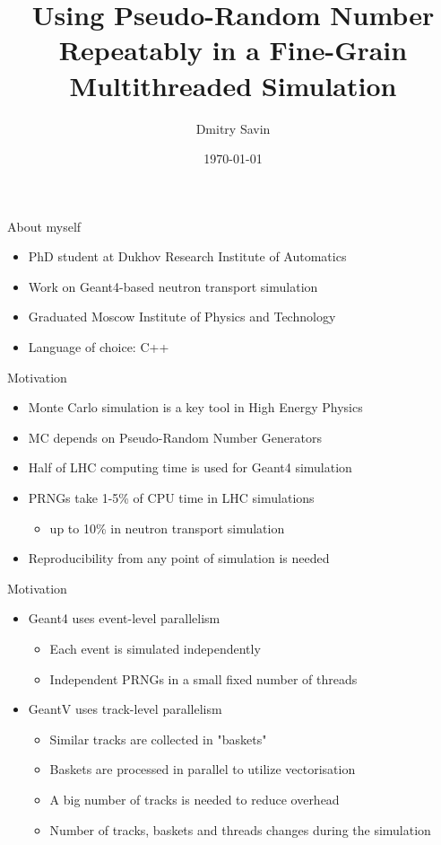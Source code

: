 \documentclass[aspectratio=169, 14pt]{beamer}
\title{Using Pseudo-Random Number Repeatably in a Fine-Grain Multithreaded Simulation}
\author{Dmitry Savin}
\date{\today}
\begin{document}
\begin{large}

 \frame{\titlepage}

 \begin{frame}{About myself}
  \begin{itemize}
   \item PhD student at Dukhov Research Institute of Automatics
   \item Work on Geant4-based neutron transport simulation
   \item Graduated Moscow Institute of Physics and Technology
   \item Language of choice: C++
  \end{itemize}
 \end{frame}

 \begin{frame}{Motivation}
 \large
  \begin{itemize}
   \item Monte Carlo simulation is a key tool in High Energy Physics
   \item MC depends on Pseudo-Random Number Generators
   \item Half of LHC computing time is used for Geant4 simulation
   \item PRNGs take 1-5\% of CPU time in LHC simulations
    \begin{itemize}
     \item up to 10\% in neutron transport simulation 
    \end{itemize}
   \item Reproducibility from any point of simulation is needed
  \end{itemize}
 \end{frame}
 
  \begin{frame}{Motivation}
  \large
  \begin{itemize}
   \item Geant4 uses event-level parallelism
   \begin{itemize}
     \item Each event is simulated independently
     \item Independent PRNGs in a small fixed number of threads
    \end{itemize}
   \item GeantV uses track-level parallelism
    \begin{itemize}
     \item Similar tracks are collected in "baskets"
     \item Baskets are processed in parallel to utilize vectorisation
     \item A big number of tracks is needed to reduce overhead
     \item Number of tracks, baskets and threads changes during the simulation
    \end{itemize}


\end{itemize}
\end{frame}
\end{large}
\end{document}
